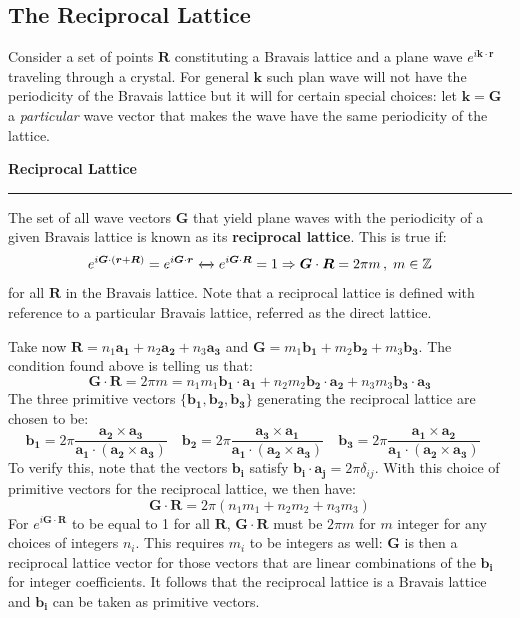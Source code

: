 \documentclass[10.75pt,a4paper,openright,bottom=2cm]{article}
\renewcommand{\Vec}[1]{\boldsymbol{#1}}
\begin{document}
\subsection{The Reciprocal Lattice}
Consider a set of points $\Vec{R}$ constituting a Bravais lattice and a plane wave $e^{i\Vec{k}\cdot\Vec{r}}$ traveling through a crystal. For general $\Vec{k}$ such plan wave will not have the periodicity of the Bravais lattice but it will for certain special choices: let $\Vec{k}=\Vec{G}$ a \textit{particular} wave vector that makes the wave have the same periodicity of the lattice.
\begin{mybox}
\textbf{Reciprocal Lattice}
\hrule
\vspace{0.15cm}
The set of all wave vectors $\Vec{G}$ that yield plane waves with the periodicity of a given Bravais lattice is known as its \textbf{reciprocal lattice}. This is true if:
\[
e^{i\Vec{G}\cdot(\Vec{r}+\Vec{R})}=e^{i\Vec{G}\cdot\Vec{r}}\xleftrightarrow{}e^{i\Vec{G}\cdot\Vec{R}}=1\Rightarrow\Vec{G}\cdot\Vec{R}=2\pi m\,,\;m\in\mathbb{Z}
\]
for all $\Vec{R}$ in the Bravais lattice. Note that a reciprocal lattice is defined with reference to a particular Bravais lattice, referred as the direct lattice.
\end{mybox}
\noindent
Take now $\Vec{R}=n_1\Vec{a_1}+n_2\Vec{a_2}+n_3\Vec{a_3}$ and $\Vec{G}=m_1\Vec{b_1}+m_2\Vec{b_2}+m_3\Vec{b_3}$. The condition found above is telling us that:
\[
\Vec{G}\cdot\Vec{R}=2\pi m=n_1m_1\Vec{b_1}\cdot\Vec{a_1}+n_2m_2\Vec{b_2}\cdot\Vec{a_2}+n_3m_3\Vec{b_3}\cdot\Vec{a_3}
\]
The three primitive vectors $\{\Vec{b_1},\Vec{b_2},\Vec{b_3}\}$ generating the reciprocal lattice are chosen to be:
\[
\Vec{b_1}=2\pi\frac{\Vec{a_2}\times\Vec{a_3}}{\Vec{a_1}\cdot(\Vec{a_2}\times\Vec{a_3})} \quad
\Vec{b_2}=2\pi\frac{\Vec{a_3}\times\Vec{a_1}}{\Vec{a_1}\cdot(\Vec{a_2}\times\Vec{a_3})}\quad
\Vec{b_3}=2\pi\frac{\Vec{a_1}\times\Vec{a_2}}{\Vec{a_1}\cdot(\Vec{a_2}\times\Vec{a_3})}\quad
\]
To verify this, note that the vectors $\Vec{b_i}$ satisfy $\Vec{b_i}\cdot\Vec{a_j}=2\pi\delta_{ij}$. With this choice of primitive vectors for the reciprocal lattice, we then have:
\[
\Vec{G}\cdot\Vec{R}=2\pi(n_1m_1+n_2m_2+n_3m_3)
\]
For $e^{i\Vec{G}\cdot\Vec{R}}$ to be equal to 1 for all $\Vec{R}$, $\Vec{G}\cdot\Vec{R}$ must be $2\pi m$ for $m$ integer for any choices of integers $n_i$. This requires $m_i$ to be integers as well: $\Vec{G}$ is then a reciprocal lattice vector for those vectors that are linear combinations of the $\Vec{b_i}$ for integer coefficients. It follows that the reciprocal lattice is a Bravais lattice and $\Vec{b_i}$ can be taken as primitive vectors.\\
\end{document}

